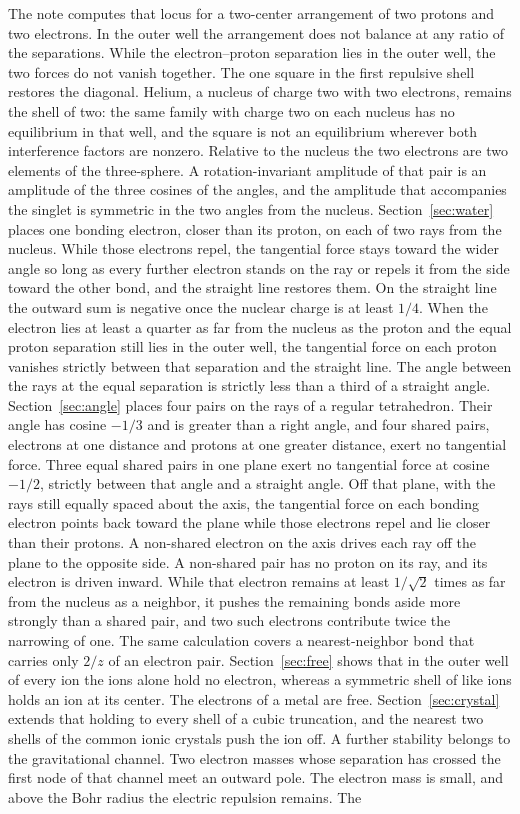 \documentclass[a4paper]{article}
\begin{document}
The note computes that locus for a two-center arrangement of two protons and two electrons. In the outer well the arrangement does not balance at any ratio of the separations. While the electron--proton separation lies in the outer well, the two forces do not vanish together. The one square in the first repulsive shell restores the diagonal. Helium, a nucleus of charge two with two electrons, remains the shell of two: the same family with charge two on each nucleus has no equilibrium in that well, and the square is not an equilibrium wherever both interference factors are nonzero. Relative to the nucleus the two electrons are two elements of the three-sphere. A rotation-invariant amplitude of that pair is an amplitude of the three cosines of the angles, and the amplitude that accompanies the singlet is symmetric in the two angles from the nucleus. Section~\ref{sec:water} places one bonding electron, closer than its proton, on each of two rays from the nucleus. While those electrons repel, the tangential force stays toward the wider angle so long as every further electron stands on the ray or repels it from the side toward the other bond, and the straight line restores them. On the straight line the outward sum is negative once the nuclear charge is at least \(1/4\). When the electron lies at least a quarter as far from the nucleus as the proton and the equal proton separation still lies in the outer well, the tangential force on each proton vanishes strictly between that separation and the straight line. The angle between the rays at the equal separation is strictly less than a third of a straight angle. Section~\ref{sec:angle} places four pairs on the rays of a regular tetrahedron. Their angle has cosine \(-1/3\) and is greater than a right angle, and four shared pairs, electrons at one distance and protons at one greater distance, exert no tangential force. Three equal shared pairs in one plane exert no tangential force at cosine \(-1/2\), strictly between that angle and a straight angle. Off that plane, with the rays still equally spaced about the axis, the tangential force on each bonding electron points back toward the plane while those electrons repel and lie closer than their protons. A non-shared electron on the axis drives each ray off the plane to the opposite side. A non-shared pair has no proton on its ray, and its electron is driven inward. While that electron remains at least \(1/\sqrt{2}\) times as far from the nucleus as a neighbor, it pushes the remaining bonds aside more strongly than a shared pair, and two such electrons contribute twice the narrowing of one. The same calculation covers a nearest-neighbor bond that carries only \(2/z\) of an electron pair. Section~\ref{sec:free} shows that in the outer well of every ion the ions alone hold no electron, whereas a symmetric shell of like ions holds an ion at its center. The electrons of a metal are free. Section~\ref{sec:crystal} extends that holding to every shell of a cubic truncation, and the nearest two shells of the common ionic crystals push the ion off. A further stability belongs to the gravitational channel. Two electron masses whose separation has crossed the first node of that channel meet an outward pole. The electron mass is small, and above the Bohr radius the electric repulsion remains. The 
\end{document}
